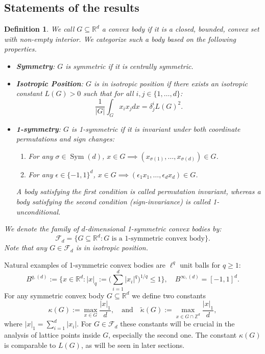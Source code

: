 \documentclass[10pt,a4paper]{amsart}
\numberwithin{equation}{section}
\newtheorem{Defn}[Thm]{Definition}
\newcommand{\Z}{\mathbb{Z}}
\newcommand{\R}{\mathbb{R}}
\DeclareMathOperator{\Sym}{Sym}
\begin{document}
\subsection{Statements of the results}
\begin{Defn}
We call $G \subseteq \R^d$ a \textit{convex body} if it is a closed, bounded, convex set with non-empty interior. We categorize such a body based on the following properties.
\begin{itemize}
    \item \textbf{Symmetry}: $G$ is \textit{symmetric} if it is centrally symmetric.
    \item \textbf{Isotropic Position}: $G$ is in \textit{isotropic position} if there exists an \textit{isotropic constant} $L(G) > 0$ such that for all $i, j \in \{1, \ldots, d\}$:$$\frac{1}{|G|} \int_G x_i x_j dx = \delta^i_j L(G)^2.$$
    \item \textbf{1-symmetry}: $G$ is \textit{1-symmetric} if it is invariant under both coordinate permutations and sign changes:
     \begin{enumerate}
        \item For any $\sigma \in \Sym(d)$, $x \in G \implies (x_{\sigma(1)}, \ldots, x_{\sigma(d)}) \in G$.
        \item For any $\epsilon \in \{-1, 1\}^d$, $x \in G \implies (\epsilon_1 x_1, \ldots, \epsilon_d x_d) \in G$.
    \end{enumerate} A body satisfying the first condition is called \textit{permutation invariant}, whereas a body satisfying the second condition (sign-invariance) is called \textit{1-unconditional}.
\end{itemize}
 We denote the family of $d$-dimensional 1-symmetric convex bodies by:$$\mathcal{F}_d = \{ G \subseteq \mathbb{R}^d : G \text{ is a 1-symmetric convex body} \}.$$
Note that any $G \in \mathcal{F}_d$ is in isotropic position. 
\end{Defn}
Natural examples of 1-symmetric convex bodies are $\ell^q$ unit balls for $q \ge 1$:
\[
B^{q,(d)}:= \Big\{x \in \R^d: |x|_q:= \Big( \sum_{i=1}^d |x_i|^q \Big)^{1/q} \le 1 \Big\}, \quad
B^{\infty,(d)}=[-1,1]^d.
\]
For any symmetric convex body $G \subseteq \R^d$ we define two constants
\[
\kappa(G):= \max_{x \in G} \frac{|x|_1}{d}, \quad \text{and} \quad\widetilde{\kappa}(G):=\max_{x \in G \cap \Z^d} \frac{|x|_1}{d},
\]
where $|x|_1= \sum_{i=1}^d |x_i|$.
For $G \in \mathcal{F}_d$ these constants will be crucial in the analysis of lattice points inside $G$, especially the second one. The constant $\kappa(G)$ is comparable to $L(G)$, as will be seen in later sections.
\end{document}
